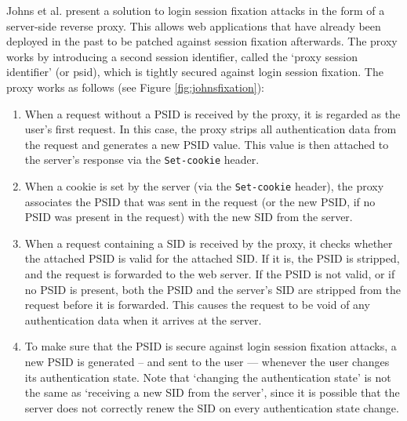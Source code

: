 Johns et al. \cite{Johns2011} present a solution to \gls{login session fixation} attacks in the form of a server-side reverse proxy. This allows web applications that have already been deployed in the past to be patched against session fixation afterwards. The proxy works by introducing a second session identifier, called the `proxy session identifier' (or \gls{psid}), which is tightly secured against login session fixation. The proxy works as follows (see Figure \ref{fig:johnsfixation}):
\begin{enumerate}
	\item When a request without a PSID is received by the proxy, it is regarded as the user's first request. In this case, the proxy strips all authentication data from the request and generates a new PSID value. This value is then attached to the server's response via the \texttt{Set-cookie} header.
	\item When a cookie is set by the server (via the \texttt{Set-cookie} header), the proxy associates the PSID that was sent in the request (or the new PSID, if no PSID was present in the request) with the new SID from the server.
	\item When a request containing a SID is received by the proxy, it checks whether the attached PSID is valid for the attached SID. If it is, the PSID is stripped, and the request is forwarded to the web server. If the PSID is not valid, or if no PSID is present, both the PSID and the server's SID are stripped from the request before it is forwarded. This causes the request to be void of any authentication data when it arrives at the server.
	\item To make sure that the PSID is secure against login session fixation attacks, a new PSID is generated -- and sent to the user --- whenever the user changes its authentication state. Note that `changing the authentication state' is not the same as `receiving a new SID from the server', since it is possible that the server does not correctly renew the SID on every authentication state change.
\end{enumerate}

